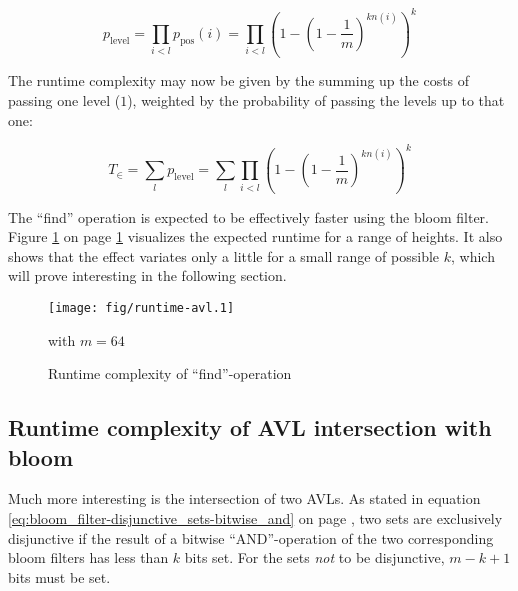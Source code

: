         \begin{equation}
            p_\mathrm{level} = \prod_{i<l} p_\mathrm{pos}(i) =
            \prod_{i<l} \left(1 - \left(1 - \frac{1}{m}\right)^{kn(i)}\right)^k
        \end{equation}

        The runtime complexity may now be given by the summing up the costs of
        passing one level ($1$), weighted by the probability of passing the
        levels up to that one:

        \begin{equation}
            T_{\in} = \sum_l p_\mathrm{level} =
            \sum_l \prod_{i<l}
            \left(1 - \left(1 - \frac{1}{m}\right)^{kn(i)}\right)^k
            \label{eq:parameters-AVL_find-T}
        \end{equation}

        The ``find'' operation is expected to be effectively faster using the
        bloom filter.
        Figure \ref{fig:parameters-AVL_bloom-runtime_find} on page
        \ref{fig:parameters-AVL_bloom-runtime_find} visualizes the expected
        runtime for a range of heights.
        It also shows that the effect variates only a little for a small range
        of possible $k$, which will prove interesting in the following section.

        \begin{figure}[!h]
            \caption{Runtime complexity of ``find''-operation}
            \label{fig:parameters-AVL_bloom-runtime_find}
            \begin{center}
                \texttt{[image: fig/runtime-avl.1]}

                with $m=64$
            \end{center}
        \end{figure}

    \subsection{Runtime complexity of AVL intersection with bloom}
    \label{sec:parameters-AVL_intersect_bloom}

        Much more interesting is the intersection of two AVLs.
        As stated in equation \ref{eq:bloom_filter-disjunctive_sets-bitwise_and}
        on page \pageref{eq:bloom_filter-disjunctive_sets-bitwise_and}, two sets
        are exclusively disjunctive if the result of a bitwise ``AND''-operation
        of the two corresponding bloom filters has less than $k$ bits set.
        For the sets \emph{not} to be disjunctive, $m-k+1$ bits must be set.

